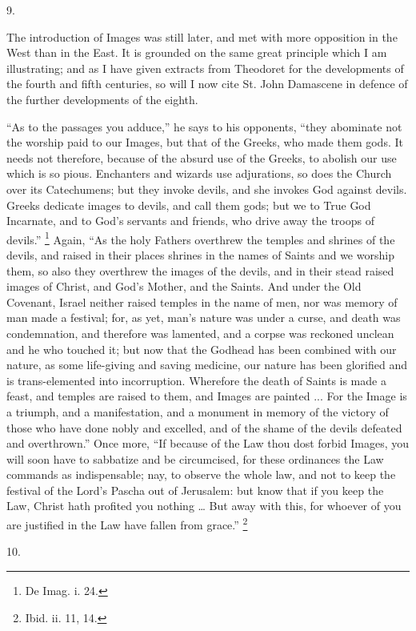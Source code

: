 9.

The introduction of Images was still later, and met
with more opposition in the West than in the East. It is
grounded on the same great principle which I am
illustrating; and as I have given extracts from Theodoret
for the developments of the fourth and fifth centuries,
so will I now cite St. John Damascene in defence of the
further developments of the eighth.

``As to the passages you adduce,'' he says to his
opponents, ``they abominate not the worship paid to
our Images, but that of the Greeks, who made them gods.
It needs not therefore, because of the absurd use of the
Greeks, to abolish our use which is so pious. Enchanters
and wizards use adjurations, so does the Church over its
Catechumens; but they invoke devils, and she invokes God
against devils. Greeks dedicate images to devils, and
call them gods; but we to True God Incarnate, and to
God's servants and friends, who drive away the troops of
devils.'' \footnote{De Imag. i. 24.}
Again, ``As the holy Fathers overthrew the temples
and shrines of the devils, and raised in their places
shrines in the names of Saints and we worship them,
so also they overthrew the images of the devils, and in
their stead raised images of Christ, and God's Mother,
and the Saints. And under the Old Covenant, Israel
neither raised temples in the name of men, nor was memory
of man made a festival; for, as yet, man's nature was
under a curse, and death was condemnation, and therefore
was lamented, and a corpse was reckoned unclean and he
who touched it; but now that the Godhead has been
combined with our nature, as some life-giving and saving
medicine, our nature has been glorified and is
trans-elemented into incorruption. Wherefore the death of
Saints is made a feast, and temples are raised to them,
and Images are painted ... For the Image is a triumph,
and a manifestation, and a monument in memory of the
victory of those who have done nobly and excelled, and of
the shame of the devils defeated and overthrown.''
Once more, ``If because of the Law thou dost forbid
Images, you will soon have to sabbatize and be
circumcised, for these ordinances the Law commands as
indispensable; nay, to observe the whole law, and not to
keep the festival of the Lord's Pascha out of Jerusalem:
but know that if you keep the Law, Christ hath profited
you nothing … But away with this, for whoever of you
are justified in the Law have fallen from grace.'' \footnote{Ibid. ii. 11, 14.}

10.

